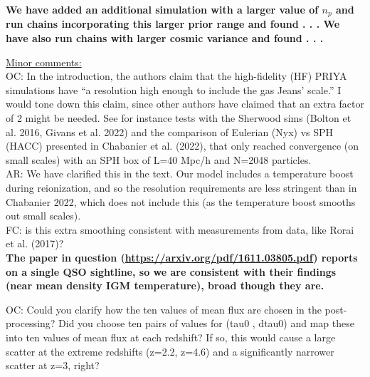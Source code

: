 \documentclass[12pt]{article}
\begin{document}
\textbf{We have added an additional simulation with a larger value of $n_p$ and run chains incorporating this larger prior range and found . . . We have also run chains with larger cosmic variance and found . . .}\\

\hrulefill \newline

\underline{Minor comments:}\\

OC: In the introduction, the authors claim that the high-fidelity (HF) PRIYA simulations have “a resolution high enough to include the gas Jeans’ scale.” I would tone down this claim, since other authors have claimed that an extra factor of 2 might be needed. See for instance tests with the Sherwood sims (Bolton et al. 2016, Givans et al. 2022) and the comparison of Eulerian (Nyx) vs SPH (HACC) presented in Chabanier et al. (2022), that only reached convergence (on small scales) with an SPH box of L=40 Mpc/h and N=2048 particles.\\

AR: We have clarified this in the text. Our model includes a temperature boost during reionization, and so the resolution requirements are less stringent than in Chabanier 2022, which does not include this (as the temperature boost smooths out small scales).\\

FC: is this extra smoothing consistent with measurements from data, like Rorai et al. (2017)?\\

\textbf{The paper in question (\url{https://arxiv.org/pdf/1611.03805.pdf}) reports on a single QSO sightline, so we are consistent with their findings (near mean density IGM temperature), broad though they are.}\\

\hrulefill \newline

OC: Could you clarify how the ten values of mean flux are chosen in the post-processing? Did you choose ten pairs of values for (tau0 , dtau0) and map these into ten values of mean flux at each redshift? If so, this would cause a large scatter at the extreme redshifts (z=2.2, z=4.6) and a significantly narrower scatter at z=3, right?\\
\end{document}
